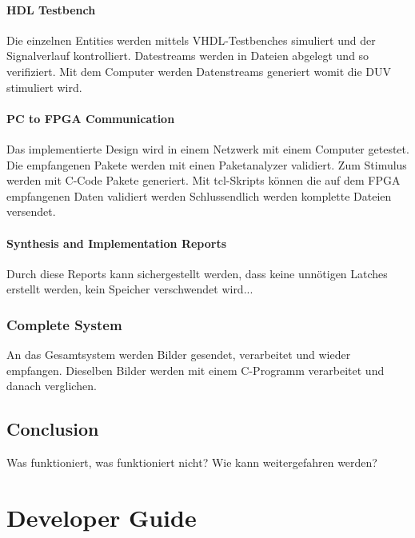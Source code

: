 \subsubsection{HDL Testbench}
Die einzelnen Entities werden mittels VHDL-Testbenches simuliert und der Signalverlauf
kontrolliert. Datestreams werden in Dateien abgelegt und so verifiziert. Mit dem
Computer werden Datenstreams generiert womit die DUV stimuliert wird.

\subsubsection{PC to FPGA Communication}
Das implementierte Design wird in einem Netzwerk mit einem Computer getestet.
Die empfangenen Pakete werden mit einen Paketanalyzer validiert. Zum Stimulus
werden mit C-Code Pakete generiert. Mit tcl-Skripts können die auf dem FPGA
empfangenen Daten validiert werden Schlussendlich werden komplette Dateien 
versendet.

\subsubsection{Synthesis and Implementation Reports}
Durch diese Reports kann sichergestellt werden, dass keine unnötigen Latches
erstellt werden, kein Speicher verschwendet wird...

\subsection{Complete System}
An das Gesamtsystem werden Bilder gesendet, verarbeitet und wieder empfangen. 
Dieselben Bilder werden mit einem C-Programm verarbeitet und danach verglichen.

\section{Conclusion}
Was funktioniert, was funktioniert nicht? Wie kann weitergefahren werden?

\chapter{Developer Guide}

